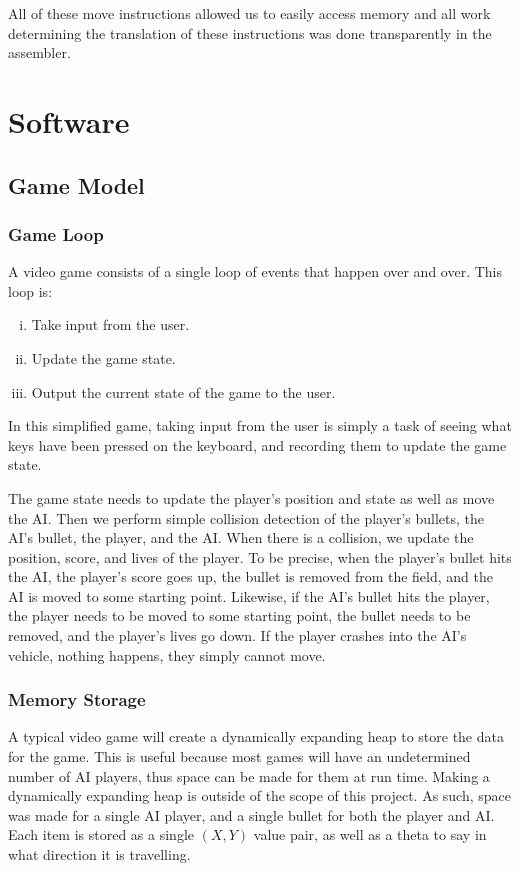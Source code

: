 \documentclass[onecolumn]{IEEEtran}
\begin{document}
All of these move instructions allowed us to easily access memory and all work determining the translation of these instructions was done transparently in the assembler.

\section{Software}
\subsection{Game Model}
\subsubsection{Game Loop}
A video game consists of a single loop of events that happen over and over.  This loop is:

\begin{enumerate}[i)]
	\item Take input from the user.
	\item Update the game state.
	\item Output the current state of the game to the user.
\end{enumerate}

In this simplified game, taking input from the user is simply a task of seeing what keys have been pressed on the keyboard, and recording them to update the game state.

The game state needs to update the player's position and state as well as move the AI.  Then we perform simple collision detection of the player's bullets, the AI's bullet, the player, and the AI.  When there is a collision, we update the position, score, and lives of the player.  To be precise, when the player's bullet hits the AI, the player's score goes up, the bullet is removed from the field, and the AI is moved to some starting point.  Likewise, if the AI's bullet hits the player, the player needs to be moved to some starting point, the bullet needs to be removed, and the player's lives go down.  If the player crashes into the AI's vehicle, nothing happens, they simply cannot move.

\subsubsection{Memory Storage}
A typical video game will create a dynamically expanding heap to store the data for the game.  This is useful because most games will have an undetermined number of AI players, thus space can be made for them at run time.  Making a dynamically expanding heap is outside of the scope of this project.  As such, space was made for a single AI player, and a single bullet for both the player and AI.  Each item is stored as a single $(X,Y)$ value pair, as well as a theta to say in what direction it is travelling.
\end{document}
